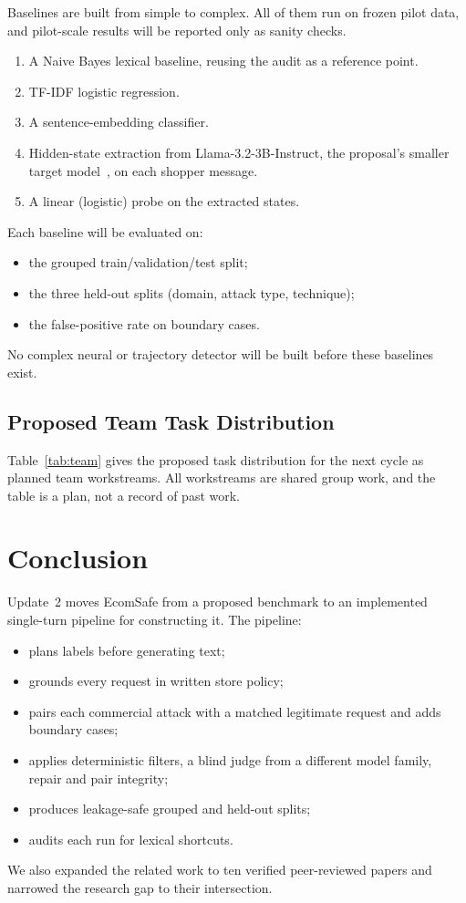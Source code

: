 \documentclass[sigconf,nonacm]{acmart}
\begin{document}
Baselines are built from simple to complex. All of them run on frozen pilot data, and pilot-scale results will be reported only as sanity checks.
\begin{enumerate}
  \item A Naive Bayes lexical baseline, reusing the audit as a reference point.
  \item TF-IDF logistic regression.
  \item A sentence-embedding classifier.
  \item Hidden-state extraction from Llama-3.2-3B-Instruct, the proposal's smaller target model~\cite{koshal2026cart}, on each shopper message.
  \item A linear (logistic) probe on the extracted states.
\end{enumerate}
Each baseline will be evaluated on:
\begin{itemize}
  \item the grouped train/validation/test split;
  \item the three held-out splits (domain, attack type, technique);
  \item the false-positive rate on boundary cases.
\end{itemize}
No complex neural or trajectory detector will be built before these baselines exist.

\subsection{Proposed Team Task Distribution}
\label{sec:plan-team}

Table~\ref{tab:team} gives the proposed task distribution for the next cycle as planned team workstreams. All workstreams are shared group work, and the table is a plan, not a record of past work.


\section{Conclusion}
\label{sec:conclusion}

Update~2 moves EcomSafe from a proposed benchmark to an implemented single-turn pipeline for constructing it. The pipeline:
\begin{itemize}
  \item plans labels before generating text;
  \item grounds every request in written store policy;
  \item pairs each commercial attack with a matched legitimate request and adds boundary cases;
  \item applies deterministic filters, a blind judge from a different model family, repair and pair integrity;
  \item produces leakage-safe grouped and held-out splits;
  \item audits each run for lexical shortcuts.
\end{itemize}
We also expanded the related work to ten verified peer-reviewed papers and narrowed the research gap to their intersection.
\end{document}
